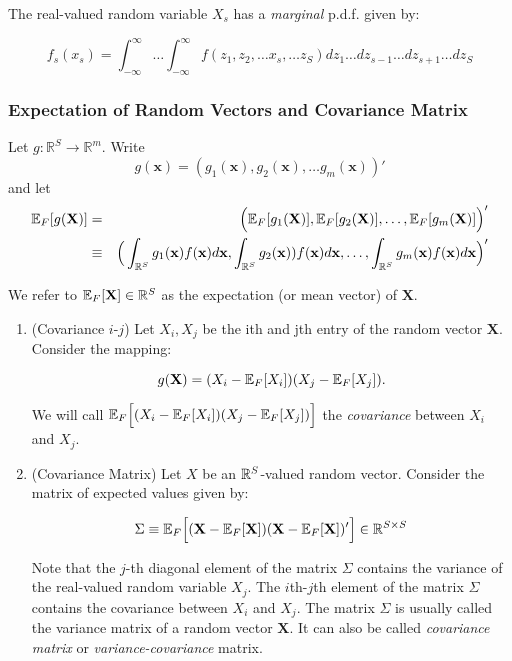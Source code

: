 \documentclass[11pt]{article} %
\begin{document}
\noindent The real-valued random variable $X_s$ has a \emph{marginal} p.d.f. given by:

$$f_s (x_s) =\int_{-\infty}^{\infty} \ldots \int_{-\infty}^{\infty}  f(z_1, z_2, \ldots x_s, \ldots z_{S})dz_{1} \ldots dz_{s-1} \ldots dz_{s+1} \ldots  d{z_S}  $$ 

\newpage


\subsubsection{Expectation of Random Vectors and Covariance Matrix}

Let $g: \mathbb{R}^{S} \rightarrow \mathbb{R}^{m}$.  Write
$$g(\textbf{x})=(g_1(\textbf{x}), g_2(\textbf{x}), \ldots g_{m}(\textbf{x}))'$$
\noindent and let
\begin{eqnarray*}
\mathbb{E}_{F}[g(\mathbf{X})] &=& \Big( \mathbb{E}_{F}[g_1(\mathbf{X})], \mathbb{E}_{F}[g_2(\mathbf{X})], \ldots, \mathbb{E}_{F}[g_m(\mathbf{X})] \Big)' \\
&\equiv& \Big( \int_{\mathbb{R}^{S}} g_1(\mathbf{x})f(\mathbf{x})d\mathbf{x}, \int_{\mathbb{R}^{S}} g_2(\mathbf{x}))f(\mathbf{x})d\mathbf{x}, \ldots, \int_{\mathbb{R}^{S}} g_m(\mathbf{x})f(\mathbf{x})d\mathbf{x}\Big)'
\end{eqnarray*}

\noindent We refer to $\mathbb{E}_{F}[\mathbf{X}] \in \mathbb{R}^{S}$ as the expectation (or mean vector) of $\mathbf{X}$. 
\begin{enumerate}
\item (Covariance $i$-$j$) Let $X_{i}, X_{j}$ be the ith and jth entry of the random vector $\mathbf{X}$. 
 Consider the mapping:

$$g(\mathbf{X}) = (X_{i} - \mathbb{E}_{F}[X_i])(X_{j} - \mathbb{E}_{F}[X_j]).$$

\noindent We will call $\mathbb{E}_{F}\Big[ (X_{i} - \mathbb{E}_{F}[X_i])(X_{j} - \mathbb{E}_{F}[X_j]) \Big]$ the \emph{covariance} between $X_i$ and $X_j$.

\item (Covariance Matrix) Let $X$ be an $\mathbb{R}^{S}$-valued random vector. Consider the matrix of expected values given by:

$$ \Sigma \equiv \mathbb{E}_{F} \Big[ (\mathbf{X} - \mathbb{E}_{F}[\mathbf{X}])(\mathbf{X} - \mathbb{E}_{F}[\mathbf{X}])'\Big] \in \mathbb{R}^{S \times S} $$

\noindent Note that the $j$-th diagonal element of the matrix $\Sigma$ contains the variance of the real-valued random variable $X_j$. The $i$th-$j$th element of the matrix $\Sigma$ contains the covariance between $X_i$ and $X_j$. The matrix $\Sigma$ is usually called the variance matrix of a random vector $\mathbf{X}$. It can also be called \emph{covariance matrix} or \emph{variance-covariance} matrix. 



\end{enumerate}
\end{document}
